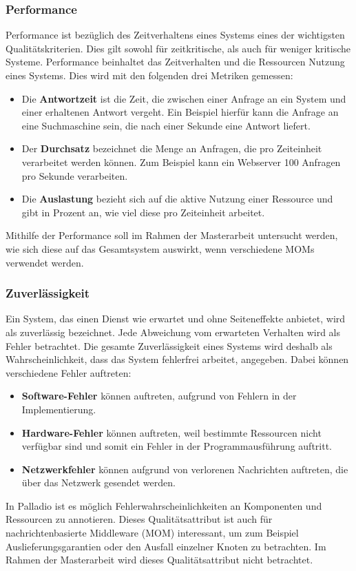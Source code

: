 \subsubsection{Performance} 
Performance ist bezüglich des Zeitverhaltens eines Systems eines der wichtigsten Qualitätskriterien. Dies gilt sowohl für zeitkritische, als auch für weniger kritische Systeme. Performance beinhaltet das Zeitverhalten und die Ressourcen Nutzung eines Systems. Dies wird mit den folgenden drei Metriken gemessen:
\begin{itemize}
\item Die \textbf{Antwortzeit} ist die Zeit, die zwischen einer Anfrage an ein System und einer erhaltenen Antwort vergeht. Ein Beispiel hierfür kann die Anfrage an eine Suchmaschine sein, die nach einer Sekunde eine Antwort liefert.
\item Der \textbf{Durchsatz} bezeichnet die Menge an Anfragen, die pro Zeiteinheit verarbeitet werden können. Zum Beispiel kann ein Webserver 100 Anfragen pro Sekunde verarbeiten.
\item Die \textbf{Auslastung} bezieht sich auf die aktive Nutzung einer Ressource und gibt in Prozent an, wie viel diese pro Zeiteinheit arbeitet. 
\end{itemize}
Mithilfe der Performance soll im Rahmen der Masterarbeit untersucht werden, wie sich diese auf das Gesamtsystem auswirkt, wenn verschiedene MOMs verwendet werden.

\subsubsection{Zuverlässigkeit}
Ein System, das einen Dienst wie erwartet und ohne Seiteneffekte anbietet, wird als zuverlässig bezeichnet. Jede Abweichung vom erwarteten Verhalten wird als Fehler betrachtet. Die gesamte Zuverlässigkeit eines Systems wird deshalb als Wahrscheinlichkeit, dass das System fehlerfrei arbeitet, angegeben. Dabei können verschiedene Fehler auftreten:
\begin{itemize}
\item \textbf{Software-Fehler} können auftreten, aufgrund von Fehlern in der Implementierung.
\item \textbf{Hardware-Fehler} können auftreten, weil bestimmte Ressourcen nicht verfügbar sind und somit ein Fehler in der Programmausführung auftritt.
\item \textbf{Netzwerkfehler} können aufgrund von verlorenen Nachrichten auftreten, die über das Netzwerk gesendet werden.
\end{itemize}
In Palladio ist es möglich Fehlerwahrscheinlichkeiten an Komponenten und Ressourcen zu annotieren. Dieses Qualitätsattribut ist auch für nachrichtenbasierte Middleware (MOM) interessant, um zum Beispiel Auslieferungsgarantien oder den Ausfall einzelner Knoten zu betrachten. Im Rahmen der Masterarbeit wird dieses Qualitätsattribut nicht betrachtet.

